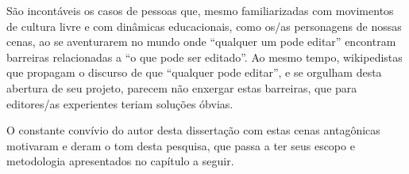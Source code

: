 São incontáveis os casos de pessoas que, mesmo familiarizadas com movimentos de cultura livre e com dinâmicas educacionais, como os/as personagens de nossas cenas, ao se aventurarem no mundo onde ``qualquer um pode editar'' encontram barreiras relacionadas a ``o que pode ser editado''. Ao mesmo tempo, wikipedistas que propagam o discurso de que ``qualquer pode editar'', e se orgulham desta abertura de seu projeto, parecem não enxergar estas barreiras, que para editores/as experientes teriam soluções óbvias.

O constante convívio do autor desta dissertação com estas cenas antagônicas motivaram e deram o tom desta pesquisa, que passa a ter seus escopo e metodologia apresentados no capítulo a seguir.